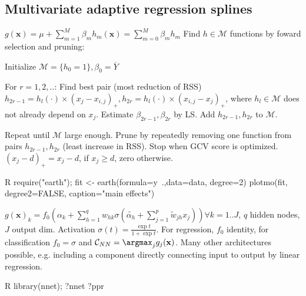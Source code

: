 \subsection{Multivariate adaptive regression splines}%
\label{sub:multivariate_adaptive_regression_splines}
\begin{sectionbox}[MARS]\nospacing{}
$g(\mathbf{x}) = \mu + \sum_{m=1}^{M}\beta_m h_m(\mathbf{x}) = \sum_{m=0}^{M}\beta_m h_m $
Find $h \in \mathcal{M}$ functions by foward selection and pruning:

\begin{enumeratenosep}[label=\roman*]
	\item Initialize $\mathcal{M} = \{ h_0 = 1\}, \beta_0 = \overline{Y}$
	\item For $r=1,2,..$: Find best pair (most reduction of RSS) $h_{2r-1}=h_l(\cdot)\times(x_j-x_{i,j})_{+}, h_{2r}=h_l(\cdot)\times(x_{i,j}-x_j)_{+}$, where $h_l \in \mathcal{M}$ does not already depend on $x_j$. Estimate $\beta_{2r-1}, \beta_{2r}$ by LS. Add $h_{2r-1}, h_{2r}$ to $\mathcal{M}$.
	\item Repeat until $\mathcal{M}$ large enough. Prune by repeatedly removing one function from pairs $h_{2r-1}, h_{2r}$ (least increase in RSS). Stop when GCV score is optimized.
$(x_j-d)_{+} = x_j-d$, if $x_j \geq d$, zero otherwise.
\end{enumeratenosep}
\begin{mintlinebox}{R}
require("earth"); 
fit <- earth(formula=y~.,data=data, degree=2)
plotmo(fit, degree2=FALSE, caption="main effects")
\end{mintlinebox}
\end{sectionbox}	

\begin{sectionbox}\nospacing{}
	$g(\mathbf{x})_k = f_0(\alpha_k + \sum_{h=1}^{q}w_{hk}\sigma(\tilde{\alpha_h} + \sum_{j=1}^{p}\tilde{w}_{jh}x_j)) \forall k=1..J$, $q$ hidden nodes, $J$ output dim. Activation $\sigma(t) = \frac{\exp t}{1 + \exp t}$. For regression, $f_0$ identity, for classification $f_0 = \sigma$ and $\mathcal{C}_{NN} = \argmax_{j} g_j(\mathbf{x})$. Many other architectures possible, e.g. including a component directly connecting input to output by linear regression.
	\begin{mintlinebox}{R}
	library(nnet); ?nnet ?ppr 
	\end{mintlinebox}
\end{sectionbox}

